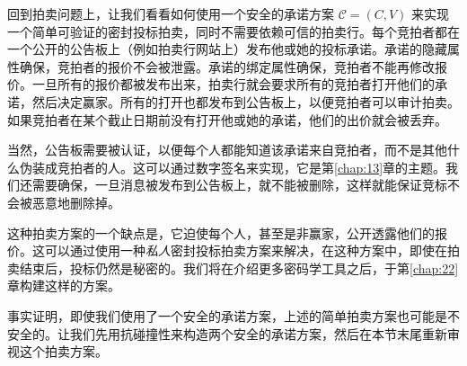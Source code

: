 \begin{snote}[一个简单的拍卖。]
回到拍卖问题上，让我们看看如何使用一个安全的承诺方案 $\mathcal{C}=(C,V)$ 来实现一个简单可验证的密封投标拍卖，同时不需要依赖可信的拍卖行。每个竞拍者都在一个公开的公告板上（例如拍卖行网站上）发布他或她的投标承诺。承诺的隐藏属性确保，竞拍者的报价不会被泄露。承诺的绑定属性确保，竞拍者不能再修改报价。一旦所有的报价都被发布出来，拍卖行就会要求所有的竞拍者打开他们的承诺，然后决定赢家。所有的打开也都发布到公告板上，以便竞拍者可以审计拍卖。如果竞拍者在某个截止日期前没有打开他或她的承诺，他们的出价就会被丢弃。

当然，公告板需要被认证，以便每个人都能知道该承诺来自竞拍者，而不是其他什么伪装成竞拍者的人。这可以通过数字签名来实现，它是第\ref{chap:13}章的主题。我们还需要确保，一旦消息被发布到公告板上，就不能被删除，这样就能保证竞标不会被恶意地删除掉。

这种拍卖方案的一个缺点是，它迫使每个人，甚至是非赢家，公开透露他们的报价。这可以通过使用一种\emph{私人}密封投标拍卖方案来解决，在这种方案中，即使在拍卖结束后，投标仍然是秘密的。我们将在介绍更多密码学工具之后，于第\ref{chap:22}章构建这样的方案。

事实证明，即使我们使用了一个安全的承诺方案，上述的简单拍卖方案也可能是不安全的。让我们先用抗碰撞性来构造两个安全的承诺方案，然后在本节末尾重新审视这个拍卖方案。
\end{snote}

